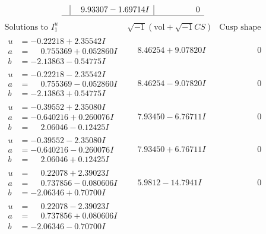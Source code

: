 \documentclass[1p]{elsarticle_modified}
\theoremstyle{definition}
\newcommand{\I}{\sqrt{-1}}
\begin{document}
$$\begin{array}{c|c|c}
 & \phantom{-}9.93307 - 1.69714 I & \phantom{-0.000000 } 0\\
 \hline 
 \end{array}$$\newpage$$\begin{array}{c|c|c}  
\text{Solutions to }I^u_{1}& \I (\text{vol} + \sqrt{-1}CS) & \text{Cusp shape}\\
 \hline 
\begin{aligned}
u &= -0.22218 + 2.35542 I \\
a &= \phantom{-}0.755369 + 0.052860 I \\
b &= -2.13863 - 0.54775 I\end{aligned}
 & \phantom{-}8.46254 + 9.07820 I & \phantom{-0.000000 } 0 \\ \hline\begin{aligned}
u &= -0.22218 - 2.35542 I \\
a &= \phantom{-}0.755369 - 0.052860 I \\
b &= -2.13863 + 0.54775 I\end{aligned}
 & \phantom{-}8.46254 - 9.07820 I & \phantom{-0.000000 } 0 \\ \hline\begin{aligned}
u &= -0.39552 + 2.35080 I \\
a &= -0.640216 + 0.260076 I \\
b &= \phantom{-}2.06046 - 0.12425 I\end{aligned}
 & \phantom{-}7.93450 - 6.76711 I & \phantom{-0.000000 } 0 \\ \hline\begin{aligned}
u &= -0.39552 - 2.35080 I \\
a &= -0.640216 - 0.260076 I \\
b &= \phantom{-}2.06046 + 0.12425 I\end{aligned}
 & \phantom{-}7.93450 + 6.76711 I & \phantom{-0.000000 } 0 \\ \hline\begin{aligned}
u &= \phantom{-}0.22078 + 2.39023 I \\
a &= \phantom{-}0.737856 - 0.080606 I \\
b &= -2.06346 + 0.70700 I\end{aligned}
 & \phantom{-}5.9812 - 14.7941 I & \phantom{-0.000000 } 0 \\ \hline\begin{aligned}
u &= \phantom{-}0.22078 - 2.39023 I \\
a &= \phantom{-}0.737856 + 0.080606 I \\
b &= -2.06346 - 0.70700 I\end{aligned}

\end{array}$$
\end{document}
